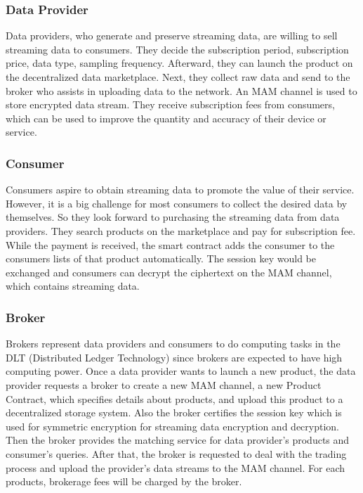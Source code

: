 \documentclass[journal,10pt,a4paper]{IEEEtran}
\begin{document}
\subsubsection{Data Provider}
Data providers, who generate and preserve streaming data, are willing to sell streaming data to consumers. They decide the subscription period, subscription price, data type, sampling frequency. Afterward, they can launch the product on the decentralized data marketplace. Next, they collect raw data and send to the broker who assists in uploading data to the network. An MAM channel\cite{MAM} is used to store encrypted data stream. They receive subscription fees from consumers, which can be used to improve the quantity and accuracy of their device or service.

\subsubsection{Consumer}
Consumers aspire to obtain streaming data to promote the value of their service. However, it is a big challenge for most consumers to collect the desired data by themselves. So they look forward to purchasing the streaming data from data providers. They search products on the marketplace and pay for subscription fee. While the payment is received, the smart contract adds the consumer to the consumers lists of that product automatically. The session key would be exchanged and consumers can decrypt the ciphertext on the MAM channel, which contains streaming data.

\subsubsection{Broker}
Brokers represent data providers and consumers to do computing tasks in the DLT (Distributed Ledger Technology) since brokers are expected to have high computing power. Once a data provider wants to launch a new product, the data provider requests a broker to create a new MAM channel, a new Product Contract, which specifies details about products, and upload this product to a decentralized storage system\cite{IPFS}. Also the broker certifies the session key which is used for symmetric encryption for streaming data encryption and decryption. Then the broker provides the matching service for data provider’s products and consumer’s queries. After that, the broker is requested to deal with the trading process and upload the provider’s data streams to the MAM channel. For each products, brokerage fees will be charged by the broker.
\end{document}
